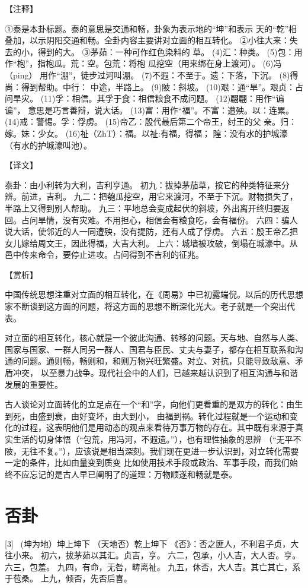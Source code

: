 \documentclass[12pt,UTF8]{ctexbook}
\begin{document}
【注释】

①泰是本卦标题。泰的意思是交通和畅，卦象为表示地的“坤”和表示 天的“乾”相叠加，以示阴阳交通和畅。全卦内容主要讲对立面的相互转化。
②小往大来：失去的小，得到的大。
③茅茹：一种可作红色染料的 草。
(4)汇：种类。
(5)包：用作“枹”，指枹瓜。荒：空。包荒：将枹 瓜挖空（用来绑在身上渡河）。
(6)冯（ping） 用作“淜”，徒步过河叫淜。
(7)不遐：不至于。遗：下落，下沉。
(8)得尚：得到帮助。中行： 中途，半路上。
(9)陂：斜坡。
(10)艰：通“旱”。艰贞：占问旱灾。
(11)孚：相信。其孚于食：相信粮食不成问题。
(12)翩翩：用作“谝谝”， 意思是巧言善辩，说大话。
(13)富：用作“福”。不富：遭殃。以：连累。
(14)戒：警惕。孚：俘虏。
(15)帝乙：殷代最后第二个帝王，纣王的父 亲。归：嫁。妹：少女。
(16)祉（ZhT）：福。以祉:有福，得福； 隍：没有水的护城濠（有水的护城濠叫池）。

【译文】

泰卦：由小利转为大利，吉利亨通。
初九：拔掉茅茄草，按它的种类特征来分辨。前进，吉利。
九二：把匏瓜挖空，用它来渡河，不至于下沉。财物损失了， 半路上又得到别人帮助。
九三：平地总会变成起伏的斜坡，外出离开终归要返回。占问旱情，没有灾难。不用担心，相信会有粮食吃，会有福份。
六四：骗人说大话，使邻近的人一同遭殃，没有提防，还有人成了俘虏。
六五：殷王帝乙把女儿嫁给周文王，因此得福，大吉大利。
上六：城墙被攻破，倒塌在城濠中。从邑中传来命令，要停止进攻。占问得到不吉利的征兆。

【赏析】

中国传统思想注重对立面的相互转化，在《周易》中已初露端倪。以后的历代思想家不断谈到这方面的问题，将这方面的思想不断深化光大。老子就是一个突出代表。

对立面的相互转化，核心就是一个彼此沟通、转移的问题。天与地、自然与人类、国家与国家、一群人同另一群人、国君与臣民、丈夫与妻子，都存在相互联系和沟通的问题。通则畅，畅则和，和则万物兴旺繁盛。对立、对抗，只能导致敌意、矛盾冲突， 以至暴力战争。现代社会中的人们，已越来越认识到了相互沟通与和谐发展的重要性。

古人谈论对立面转化的立足点在一个“和”字，向他们更看重的是双方的转化：由生到死，由盛到衰，由好变坏，由大到小， 由福到祸。转化过程就是一个运动和变化的过程，这表明他们是用动态的观点来看待万事万物的存在。其中既有来源于真实生活的切身体悟（“包荒，用冯河，不遐遗。”），也有理性抽象的思辨 （“无平不陂，无往不复。”），应该说是相当深刻。我们现在更进一步认识到，对立转化需要一定的条件，比如由量变到质变 比如使用技术手段或政治、军事手段，而我们始终不应忘记的是古人早已阐明了的道理：万物顺遂和畅就是泰。

\chapter{否卦}
[3] \ (坤为地）坤上坤下
（天地否）乾上坤下
《否》：否之匪人，不利君子贞，大往小来。
初六，拔茅茹以其汇。贞吉，亨。
六二，包承，小人吉，大人否。亨。
六三，包羞。
九四，有命，无咎，畴离祉。
九五，休否，大人吉。其亡其亡，系于苞桑。
上九，倾否，先否后喜。
\end{document}

